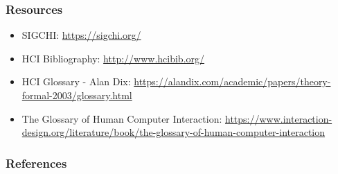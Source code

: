 \documentclass[screen, aspectratio=169]{beamer}
\begin{document}
%
\begin{frame}
\frametitle{Resources}
\begin{itemize}
\item SIGCHI: \url{https://sigchi.org/}
\item HCI Bibliography: \url{http://www.hcibib.org/}
\item HCI Glossary - Alan Dix: \url{https://alandix.com/academic/papers/theory-formal-2003/glossary.html}
\item The Glossary of Human Computer Interaction: \url{https://www.interaction-design.org/literature/book/the-glossary-of-human-computer-interaction}
\end{itemize}
\end{frame}
%
\begin{frame}[shrink=20]
  \frametitle{References}
  \printbibliography
\end{frame}
%
\end{document}
